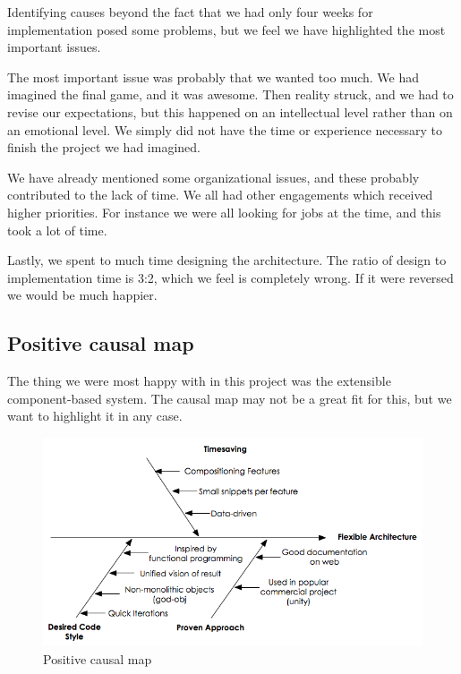 \documentclass[titlepage,a4paper,11pt]{article}
\begin{document}
Identifying causes beyond the fact that we had only four weeks for 
implementation posed some problems, but we feel we have highlighted the
most important issues.

The most important issue was probably that we wanted too much. We had 
imagined the final game, and it was awesome. Then reality struck, and we
had to revise our expectations, but this happened on an intellectual level
rather than on an emotional level. We simply did not have the time or 
experience necessary to finish the project we had imagined.

We have already mentioned some organizational issues, and these probably
contributed to the lack of time. We all had other engagements which
received higher priorities. For instance we were all looking for jobs at
the time, and this took a lot of time.

Lastly, we spent to much time designing the architecture. The ratio of
design to implementation time is 3:2, which we feel is completely wrong.
If it were reversed we would be much happier.

\subsection{Positive causal map}

The thing we were most happy with in this project was the extensible
component-based system.  The causal map may not be a great fit for this,
but we want to highlight it in any case.

\begin{figure}
    \begin{center}
    \includegraphics[width=\linewidth]{graphics/posMap}
    \caption{Positive causal map}
    \label{fig:posmap}
    \end{center}
\end{figure}
\end{document}
